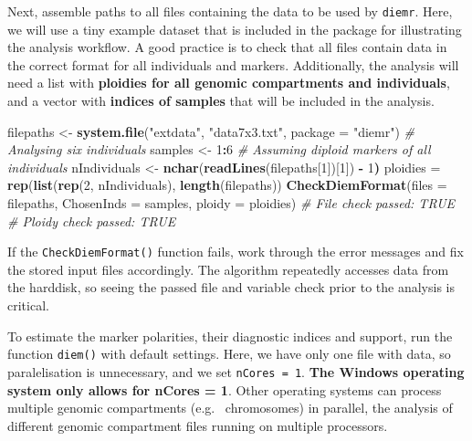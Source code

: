 \documentclass[
]{book}
\newenvironment{Shaded}{\begin{snugshade}}{\end{snugshade}}
\newcommand{\AttributeTok}[1]{\textcolor[rgb]{0.13,0.29,0.53}{#1}}
\newcommand{\CommentTok}[1]{\textcolor[rgb]{0.56,0.35,0.01}{\textit{#1}}}
\newcommand{\DecValTok}[1]{\textcolor[rgb]{0.00,0.00,0.81}{#1}}
\newcommand{\ErrorTok}[1]{\textcolor[rgb]{0.64,0.00,0.00}{\textbf{#1}}}
\newcommand{\FunctionTok}[1]{\textcolor[rgb]{0.13,0.29,0.53}{\textbf{#1}}}
\newcommand{\NormalTok}[1]{#1}
\newcommand{\OtherTok}[1]{\textcolor[rgb]{0.56,0.35,0.01}{#1}}
\newcommand{\SpecialCharTok}[1]{\textcolor[rgb]{0.81,0.36,0.00}{\textbf{#1}}}
\newcommand{\StringTok}[1]{\textcolor[rgb]{0.31,0.60,0.02}{#1}}
\begin{document}
Next, assemble paths to all files containing the data to be used by \texttt{diemr}.
Here, we will use a tiny example dataset that is included in the package for illustrating
the analysis workflow. A good practice is to check that all files contain data in the
correct format for all individuals and markers. Additionally, the analysis will need a
list with \textbf{ploidies for all genomic compartments and individuals}, and a vector with
\textbf{indices of samples} that will be included in the analysis.

\begin{Shaded}
\begin{Highlighting}[]
\NormalTok{filepaths }\OtherTok{\textless{}{-}} \FunctionTok{system.file}\NormalTok{(}\StringTok{"extdata"}\NormalTok{, }\StringTok{"data7x3.txt"}\NormalTok{, }\AttributeTok{package =} \StringTok{"diemr"}\NormalTok{)}
\CommentTok{\# Analysing six individuals}
\NormalTok{samples }\OtherTok{\textless{}{-}} \DecValTok{1}\SpecialCharTok{:}\DecValTok{6}
\CommentTok{\# Assuming diploid markers of all individuals}
\NormalTok{nIndividuals }\OtherTok{\textless{}{-}} \FunctionTok{nchar}\NormalTok{(}\FunctionTok{readLines}\NormalTok{(filepaths[}\DecValTok{1}\NormalTok{])[}\DecValTok{1}\NormalTok{]) }\SpecialCharTok{{-}} \DecValTok{1}\ErrorTok{)}
\NormalTok{ploidies }\OtherTok{=} \FunctionTok{rep}\NormalTok{(}\FunctionTok{list}\NormalTok{(}\FunctionTok{rep}\NormalTok{(}\DecValTok{2}\NormalTok{, nIndividuals), }\FunctionTok{length}\NormalTok{(filepaths))}
\FunctionTok{CheckDiemFormat}\NormalTok{(}\AttributeTok{files =}\NormalTok{ filepaths, }
                \AttributeTok{ChosenInds =}\NormalTok{ samples,}
                \AttributeTok{ploidy =}\NormalTok{ ploidies)}
\CommentTok{\# File check passed: TRUE}
\CommentTok{\# Ploidy check passed: TRUE}
\end{Highlighting}
\end{Shaded}

If the \texttt{CheckDiemFormat()} function fails, work through the error messages and fix
the stored input files accordingly. The algorithm repeatedly accesses data from the
harddisk, so seeing the passed file and variable check prior to the analysis is critical.

To estimate the marker polarities, their diagnostic indices and support, run the function
\texttt{diem()} with default settings. Here, we have only one file with data, so paralelisation
is unnecessary, and we set \texttt{nCores\ =\ 1}. \textbf{The Windows operating system only allows for
nCores = 1}. Other operating systems can process multiple genomic compartments (e.g.~
chromosomes) in parallel, the analysis of different genomic compartment files running on
multiple processors.
\end{document}
